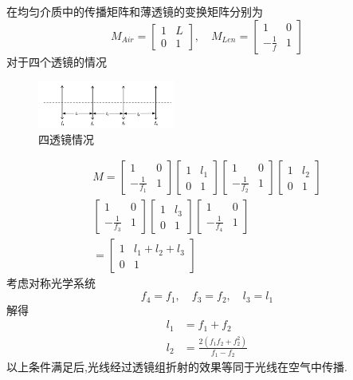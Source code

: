 \documentclass[UTF8]{gapd}
\begin{document}
在均匀介质中的传播矩阵和薄透镜的变换矩阵分别为
\begin{equation}
  M_{Air}=
  \begin{bmatrix}
      1 & L\\
      0 & 1
  \end{bmatrix} ,\quad M_{Len}=\begin{bmatrix}
    1 & 0\\
    -\frac{1}{f} & 1
\end{bmatrix}  
\end{equation}
对于四个透镜的情况
\begin{figure}
  \centering
  \includegraphics[width=0.4\textwidth]{images/4.png}
  \caption{四透镜情况}
\end{figure}
\begin{multline}
  M=
  \begin{bmatrix}
      1 & 0\\
      -\frac{1}{f_1} & 1
  \end{bmatrix}\begin{bmatrix}
      1&l_1\\
      0&1
  \end{bmatrix}\begin{bmatrix}
      1 & 0\\
      -\frac{1}{f_2} & 1
  \end{bmatrix}\begin{bmatrix}
      1&l_2\\
      0&1
  \end{bmatrix}\\
  \begin{bmatrix}
      1 & 0\\
      -\frac{1}{f_3} & 1
  \end{bmatrix}\begin{bmatrix}
      1&l_3\\
      0&1
  \end{bmatrix}\begin{bmatrix}
      1 & 0\\
      -\frac{1}{f_4} & 1
  \end{bmatrix}\\
  =\begin{bmatrix}
      1&l_1+l_2+l_3\\
      0&1
  \end{bmatrix}
\end{multline}
考虑对称光学系统
\begin{equation}
  f_4=f_1,\quad f_3=f_2,\quad l_3=l_1
\end{equation}
解得
\begin{align}
  l_1&=f_1+f_2\\
  l_2&=\frac{2(f_1f_2+f_2^2)}{f_1-f_2}
\end{align}
以上条件满足后,光线经过透镜组折射的效果等同于光线在空气中传播.
\end{document}
